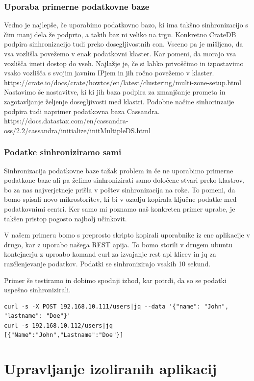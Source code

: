 \documentclass[a4paper, 12pt]{book}
\begin{document}
\subsection{Uporaba primerne podatkovne baze}
Vedno je najlepše, če uporabimo podatkovno bazo, ki ima takšno sinhronizacijo s čim manj dela že podprto, a takih baz ni veliko na trgu.
Konkretno CrateDB podpira sinhronizacijo tudi preko dosegljivostnih con.
Vseeno pa je mišljeno, da vsa vozlišla povežemo v enak podatkovni klaster.
Kar pomeni, da morajo vsa vozlišča imeti dostop do vseh.
Najlažje je, če si lahko privoščimo in izpostavimo vsako vozlišča s svojim javnim IPjem in jih ročno povežemo v klaster.
https://crate.io/docs/crate/howtos/en/latest/clustering/multi-zone-setup.html
Nastavimo še nastavitve, ki ki jih baza podpira za zmanjšanje prometa in zagotavljanje željenje dosegljivosti med klastri.
Podobne načine sinhorinzaije podpira tudi naprimer podatkovna baza Cassandra.
https://docs.datastax.com/en/cassandra-oss/2.2/cassandra/initialize/initMultipleDS.html
\subsection{Podatke sinhroniziramo sami}
Sinhronizacija podatkovne baze tažak problem in če ne uporabimo primerne podatkone baze ali pa želimo sinhronizirati samo določene stvari preko klastrov, bo za nas najverjetneje prišla v poštev sinhronizacija na roke. To pomeni, da bomo spisali novo mikrostoritev, ki bi v ozadju kopirala ključne podatke med podatkovnimi centri.
Ker samo mi poznamo naš konkreten primer uprabe, je takšen pristop pogosto najbolj učinkovit.

V našem primeru bomo s preprosto skripto kopirali uporabnike iz ene aplikacije v drugo, kar z uporabo našega REST apija.
To bomo storili v drugem ubuntu kontejnerju z uproabo komand curl za izvajanje rest api klicev in jq za razčlenjevanje podatkov.
Podatki se sinhronizirajo vsakih 10 sekund.

Primer še testiramo in dobimo spodnji izhod, kar potrdi, da so se podatki uspešno sinhronizirali.
\begin{verbatim}
curl -s -X POST 192.168.10.111/users|jq --data '{"name": "John", "lastname": "Doe"}'
curl -s 192.168.10.112/users|jq
[{"Name":"John","Lastname":"Doe"}]
\end{verbatim}



\chapter{Upravljanje izoliranih aplikacij}
\end{document}
